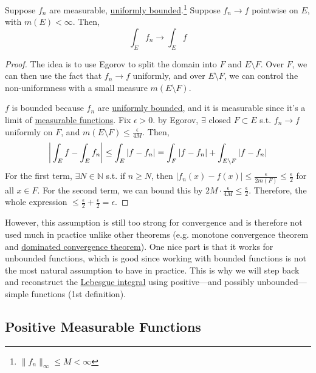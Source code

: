   \begin{theorem}
    \label{thm:bounded-convergence-theorem}
    Suppose $f_n$ are measurable, \hyperref[real-def:uniformly-bounded]{uniformly bounded}.\footnote{$\|f_n\|_\infty \leq M < \infty$} Suppose $f_n \to f$ pointwise on $E$, with $m(E) < \infty$. Then, 
    \begin{equation}
      \int_E f_n \to \int_E f
    \end{equation}
  \end{theorem}
  \begin{proof}
    The idea is to use Egorov to split the domain into $F$ and $E \setminus F$. Over $F$, we can then use the fact that $f_n \to f$ uniformly, and over $E \setminus F$, we can control the non-uniformness with a small measure $m(E \setminus F)$. 

    $f$ is bounded because $f_n$ are \hyperref[real-def:uniformly-bounded]{uniformly bounded}, and it is measurable since it's a limit of \hyperref[def:measurable-function]{measurable functions}. Fix $\epsilon > 0$. by Egorov, $\exists$ closed $F \subset E$ s.t. $f_n \to f$ uniformly on $F$, and $m(E \setminus F) \leq \frac{\epsilon}{4M}$. Then, 
    \begin{equation}
      \bigg| \int_E f - \int_E f_n \bigg| \leq \int_E |f - f_n| = \int_F |f - f_n| + \int_{E \setminus F} |f - f_n|  \\ 
    \end{equation}
    For the first term, $\exists N \in \mathbb{N}$ s.t. if $n \geq N$, then $|f_n (x) - f(x)| \leq \frac{\epsilon}{2 m(F)} \leq \frac{\epsilon}{2}$ for all $x \in F$. For the second term, we can bound this by $2M \cdot \frac{\epsilon}{4M} \leq \frac{\epsilon}{2}$. Therefore, the whole expression $\leq \frac{\epsilon}{2} + \frac{\epsilon}{2} = \epsilon$. 
  \end{proof}

  However, this assumption is still too strong for convergence and is therefore not used much in practice unlike other theorems (e.g. monotone convergence theorem and \hyperref[thm:dominated-convergence-theorem]{dominated convergence theorem}). One nice part is that it works for unbounded functions, which is good since working with bounded functions is not the most natural assumption to have in practice. This is why we will step back and reconstruct the \hyperref[def:leb-int-signed]{Lebesgue integral} using positive---and possibly unbounded---simple functions (1st definition). 

\subsection{Positive Measurable Functions} 

